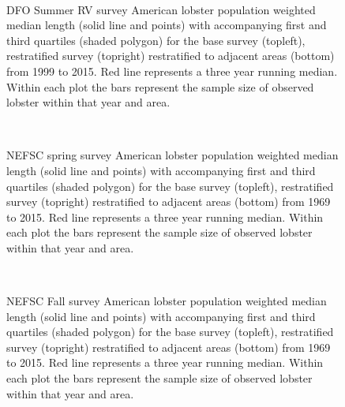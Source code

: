 \documentclass[11pt]{article}
\newcommand{\D}{.}
\newcommand{\e}{/backup/bio_data/bio.lobster/figures/} %
\begin{document}


\begin{figure}
\centering
{}
\\
\caption{DFO Summer RV survey American lobster population weighted median length (solid line and points) with accompanying first and third quartiles (shaded polygon) for the base survey (topleft), restratified survey (topright) restratified to adjacent areas (bottom) from 1999 to 2015. Red line represents a three year running median. Within each plot the bars represent the sample size of observed lobster within that year and area.}
\end{figure}
\clearpage


\begin{figure}
\centering
{}
\\
\caption{NEFSC spring survey American lobster population weighted median length (solid line and points) with accompanying first and third quartiles (shaded polygon) for the base survey (topleft), restratified survey (topright) restratified to adjacent areas (bottom) from 1969 to 2015. Red line represents a three year running median. Within each plot the bars represent the sample size of observed lobster within that year and area. }
\end{figure}
\clearpage



\begin{figure}
\centering
{}
\\
\caption{NEFSC Fall survey American lobster population weighted median length (solid line and points) with accompanying first and third quartiles (shaded polygon) for the base survey (topleft), restratified survey (topright) restratified to adjacent areas (bottom) from 1969 to 2015. Red line represents a three year running median. Within each plot the bars represent the sample size of observed lobster within that year and area. }
\end{figure}
\clearpage
\end{document}
